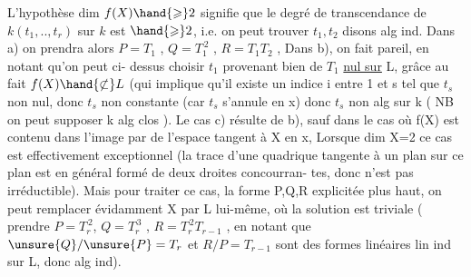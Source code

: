 
L'hypothèse  dim $f(X)\hand{\geqslant} 2$  signifie que  le degré de transcendance de
$k(t_1,..,t_r)$ sur $k$  est $\hand{\geqslant} 2$, i.e. on peut trouver  $t_1,t_2$ disons alg ind.
Dans a) on prendra alors   $P = T_1$ , $Q = T_1^{\,2}$ , $R = T_1T_2$ , Dans b), on
fait pareil,  en notant qu'on peut ci-%
dessus choisir $t_1$ provenant bien de $T_1$ \uline{nul sur} L, grâce au fait $f(X)\hand{\not\subset} L$
(qui implique qu'il  existe un indice  i  entre 1 et s tel que $t_s$ non
nul, donc $t_s$ non constante (car $t_s$ s'annule en x) donc $t_s$  non alg sur k
( NB on peut supposer k alg clos ).  Le cas c) résulte de b),  sauf dans le cas où  f(X) est contenu dans
l'image  par  de l'espace tangent à X en x,  \hand{[}Lorsque dim X=2
ce cas est effectivement exceptionnel (la trace d'une quadrique tangente
à un plan sur ce plan est en général formé de deux droites concourran-%
tes, donc n'est pas irréductible)\hand{]}. Mais pour traiter ce cas,  la
forme P,Q,R explicitée plus haut, on peut remplacer évidamment X par
L lui-même, où la solution est triviale (  prendre $P=T_r^{\,2}$, $Q=T_r^{\,3}$ ,
$R = T_r^{\,2}T_{r-1}$ , en notant que  $\unsure{Q}/\unsure{P} = T_r$ et  $R/P = T_{r-1}$ sont des formes
linéaires lin ind sur L, donc alg ind). 

